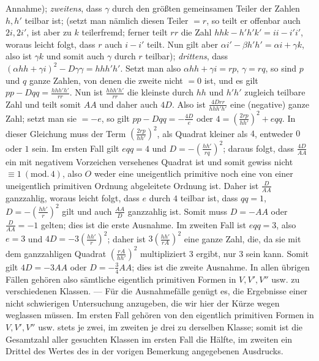 Annahme); \textit{zweitens}, dass \(\gamma\) durch den größten gemeinsamen Teiler der Zahlen \(h,h'\) teilbar ist; (setzt man nämlich diesen Teiler \(=r\), so teilt er offenbar auch \(2i,2i'\), ist aber zu \(k\) teilerfremd; ferner teilt \(rr\) die Zahl \(hhk-h'h'k'=ii-i'i'\), woraus leicht folgt, dass \(r\) auch \(i-i'\) teilt. Nun gilt aber \(\alpha i'-\beta h'h'=\alpha i+\gamma k\), also ist \(\gamma k\) und somit auch \(\gamma\) durch \(r\) teilbar); \textit{drittens}, dass \((\alpha hh+\gamma i)^2-D\gamma\gamma=hhh'h'\). Setzt man also \(\alpha hh+\gamma i=rp\), \(\gamma=rq\), so sind \(p\) und \(q\) ganze Zahlen, von denen die zweite nicht \(=0\) ist, und es gilt \(pp-Dqq=\frac{hhh'h'}{rr}\). Nun ist \(\frac{hhh'h'}{rr}\) die kleinste durch \(hh\) und \(h'h'\) zugleich teilbare Zahl und teilt somit \(AA\) und daher auch \(4D\). Also ist \(\frac{4Drr}{hhh'h'}\) eine (negative) ganze Zahl; setzt man sie \(=-e\), so gilt \(pp-Dqq=-\frac{4D}{e}\) oder \(4=(\frac{2rp}{hh'})^2+eqq\). In dieser Gleichung muss der Term \((\frac{2rp}{hh'})^2\), als Quadrat kleiner als \(4\), entweder \(0\) oder \(1\) sein. Im ersten Fall gilt \(eqq=4\) und \(D=-(\frac{hh'}{rq})^2\); daraus folgt, dass \(\frac{4D}{AA}\) ein mit negativem Vorzeichen versehenes Quadrat ist und somit gewiss nicht \(\equiv1\ (\mathrm{mod.}\,4)\), also \(O\) weder eine uneigentlich primitive noch eine von einer uneigentlich primitiven Ordnung abgeleitete Ordnung ist. Daher ist \(\frac{D}{AA}\) ganzzahlig, woraus leicht folgt, dass \(e\) durch \(4\) teilbar ist, dass \(qq=1\), \(D=-(\frac{hh'}{r})^2\) gilt und auch \(\frac{AA}{D}\) ganzzahlig ist. Somit muss \(D=-AA\) oder \(\frac{D}{AA}=-1\) gelten; dies ist die erste Ausnahme. Im zweiten Fall ist \(eqq=3\), also \(e=3\) und \(4D=-3(\frac{hh'}{r})^2\); daher ist \(3(\frac{hh'}{rA})^2\) eine ganze Zahl, die, da sie mit dem ganzzahligen Quadrat \((\frac{rA}{hh'})^2\) multipliziert \(3\) ergibt, nur \(3\) sein kann. Somit gilt \(4D=-3AA\) oder \(D=-\frac34 AA\); dies ist die zweite Ausnahme. In allen übrigen Fällen gehören also sämtliche eigentlich primitiven Formen in \(V,V',V''\) usw. zu verschiedenen Klassen. --- Für die Ausnahmefälle genügt es, die Ergebnisse einer nicht schwierigen Untersuchung anzugeben, die wir hier der Kürze wegen weglassen müssen. Im ersten Fall gehören von den eigentlich primitiven Formen in \(V,V',V''\) usw. stets je zwei, im zweiten je drei zu derselben Klasse; somit ist die Gesamtzahl aller gesuchten Klassen im ersten Fall die Hälfte, im zweiten ein Drittel des Wertes des in der vorigen Bemerkung angegebenen Ausdrucks.

